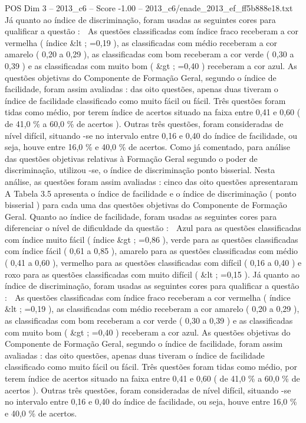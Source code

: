 \begin{textsample}{POS Dim 3 – 2013\_c6 – Score -1.00 – 2013\_c6/enade\_2013\_ef\_ff5b888e18.txt}
Já quanto ao índice de discriminação, foram usadas as seguintes cores para qualificar a questão :  As questões classificadas com índice fraco receberam a cor vermelha ( índice \&lt ; =0,19 ), as classificadas com médio receberam a cor amarelo ( 0,20 a 0,29 ), as classificadas com bom receberam a cor verde ( 0,30 a 0,39 ) e as classificadas com muito bom ( \&gt ; =0,40 ) receberam a cor azul.
As questões objetivas do Componente de Formação Geral, segundo o índice de facilidade, foram assim avaliadas : das oito questões, apenas duas tiveram o índice de facilidade classificado como muito fácil ou fácil.
Três questões foram tidas como médio, por terem índice de acertos situado na faixa entre 0,41 e 0,60 ( de 41,0 \% a 60,0 \% de acertos ).
Outras três questões, foram consideradas de nível difícil, situando -se no intervalo entre 0,16 e 0,40 do índice de facilidade, ou seja, houve entre 16,0 \% e 40,0 \% de acertos.
Como já comentado, para análise das questões objetivas relativas à Formação Geral segundo o poder de discriminação, utilizou -se, o índice de discriminação ponto bisserial.
Nesta análise, as questões foram assim avaliadas : cinco das oito questões apresentaram A Tabela 3.5 apresenta o índice de facilidade e o índice de discriminação ( ponto bisserial ) para cada uma das questões objetivas do Componente de Formação Geral.
Quanto ao índice de facilidade, foram usadas as seguintes cores para diferenciar o nível de dificuldade da questão :  Azul para as questões classificadas com índice muito fácil ( índice \&gt ; =0,86 ), verde para as questões classificadas com índice fácil ( 0,61 a 0,85 ), amarelo para as questões classificadas com médio ( 0,41 a 0,60 ), vermelho para as questões classificadas com difícil ( 0,16 a 0,40 ) e roxo para as questões classificadas com muito difícil ( \&lt ; =0,15 ).
Já quanto ao índice de discriminação, foram usadas as seguintes cores para qualificar a questão :  As questões classificadas com índice fraco receberam a cor vermelha ( índice \&lt ; =0,19 ), as classificadas com médio receberam a cor amarelo ( 0,20 a 0,29 ), as classificadas com bom receberam a cor verde ( 0,30 a 0,39 ) e as classificadas com muito bom ( \&gt ; =0,40 ) receberam a cor azul.
As questões objetivas do Componente de Formação Geral, segundo o índice de facilidade, foram assim avaliadas : das oito questões, apenas duas tiveram o índice de facilidade classificado como muito fácil ou fácil.
Três questões foram tidas como médio, por terem índice de acertos situado na faixa entre 0,41 e 0,60 ( de 41,0 \% a 60,0 \% de acertos ).
Outras três questões, foram consideradas de nível difícil, situando -se no intervalo entre 0,16 e 0,40 do índice de facilidade, ou seja, houve entre 16,0 \% e 40,0 \% de acertos.

\end{textsample}
